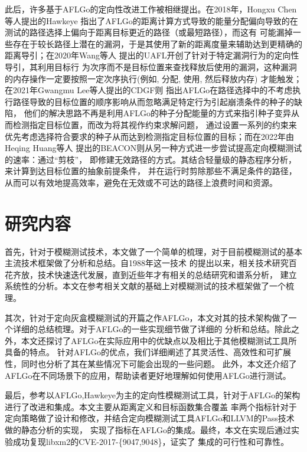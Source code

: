 \documentclass[bachelor]{njupthesis}
\begin{document}
此后，许多基于AFLGo的定向性改进工作被相继提出。在2018年，Hongxu Chen等人提出的Hawkeye\cite{chen2018hawkeye}
指出了AFLGo的距离计算方式导致的能量分配偏向导致的在测试的路径选择上偏向于距离目标更近的路径（或最短路径），而这有
可能漏掉一些存在于较长路径上潜在的漏洞，于是其使用了新的距离度量来辅助达到更精确的距离导引；在2020年Wang等人
提出的UAFL\cite{wang2020typestate}开创了针对于特定漏洞行为的定向性导引，其利用目标行
为次序而不是目标位置来查找释放后使用的漏洞，这种漏洞的内存操作一定要按照一定次序执行(例如, 分配,
使用, 然后释放内存) 才能触发；在2021年Gwangmu Lee等人提出的CDGF\cite{lee2021constraint}则
指出AFLGo在路径选择中的不考虑执行路径导致的目标位置的顺序影响从而忽略满足特定行为引起崩溃条件的种子的缺陷，
他们的解决思路不再是利用AFLGo的种子分配能量的方式来指引种子变异从而检测指定目标位置，而改为将其视作约束求解问题，
通过设置一系列的约束来优先考虑选择符合要求的种子从而达到检测指定目标位置的目标；而在2022年由Heqing Huang等人
提出的BEACON\cite{huang2022beacon}则从另一种方式进一步尝试提高定向模糊测试的速率：通过“剪枝”，
即修建无效路径的方式。其结合轻量级的静态程序分析，来计算到达目标位置的抽象前提条件，
并在运行时剪除那些不满足条件的路径，从而可以有效地提高效率，避免在无效或不可达的路径上浪费时间和资源。

\section{研究内容}
首先，针对于模糊测试技术，本文做了一个简单的梳理，对于目前模糊测试的基本主流技术框架做了分析和总结。自1988年这一技术
的提出以来，相关技术研究百花齐放，技术快速迭代发展，直到近些年才有相关的总结研究和谱系分析\cite{manes2019art,zhu2022fuzzing}，
建立系统性的分析。本文在参考相关文献的基础上对模糊测试的技术框架做了一个梳理。

其次，针对于定向灰盒模糊测试的开篇之作AFLGo，本文对其的技术架构做了一个详细的总结梳理。对于AFLGo的一些实现细节做了详细的
分析和总结。除此之外，本文还探讨了AFLGo在实际应用中的优缺点以及相比于其他模糊测试工具所具备的特点。
针对AFLGo的优点，我们详细阐述了其灵活性、高效性和可扩展性，同时也分析了其在某些情况下可能会出现的一些问题。
此外，本文还介绍了AFLGo在不同场景下的应用，帮助读者更好地理解如何使用AFLGo进行测试。

最后，参考以AFLGo,Hawkeye为主的定向性模糊测试工具，针对于AFLGo的架构进行了改进和集成。本文主要从距离定义和目标函数集合覆盖
率两个指标针对于定向策略做了设计和修改，并结合定向模糊测试工具AFLGo和LLVM的Pass\cite{Pass}技术做的静态分析的实现，
实现了指标在AFLGo的集成。最终，本文在实现后通过实验成功复现libxm2\cite{Libxml2}的CVE-2017-\{9047,9048\}，证实了
集成的可行性和可靠性。
\end{document}
